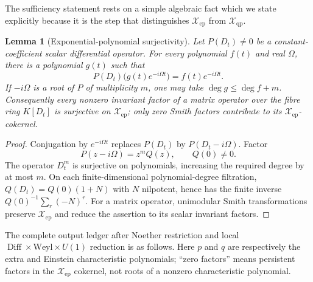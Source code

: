 \documentclass[11pt]{article}
\newtheorem{lemma}[theorem]{Lemma}
\theoremstyle{definition}
\theoremstyle{remark}
\newcommand{\Xep}{\mathscr X_{\mathrm{ep}}}
\newcommand{\Xqp}{\mathscr X_{\mathrm{qp}}}
\newcommand{\Diff}{\operatorname{Diff}}
\begin{document}
The sufficiency statement rests on a simple algebraic fact which we state
explicitly because it is the step that distinguishes \(\Xep\) from
\(\Xqp\).

\begin{lemma}[Exponential-polynomial surjectivity]
\label{lem:ep-surjectivity}
Let \(P(D_t)\ne0\) be a constant-coefficient scalar differential operator.
For every polynomial \(f(t)\) and real \(\Omega\), there is a polynomial
\(g(t)\) such that
\begin{equation}
 P(D_t)\bigl(g(t)e^{-i\Omega t}\bigr)
 =f(t)e^{-i\Omega t}.
\end{equation}
If \(-i\Omega\) is a root of \(P\) of multiplicity \(m\), one may take
\(\deg g\leq\deg f+m\).  Consequently every nonzero invariant factor of a
matrix operator over the fibre ring \(K[D_t]\) is surjective on \(\Xep\);
only zero Smith factors contribute to its \(\Xep\)-cokernel.
\end{lemma}

\begin{proof}
Conjugation by \(e^{-i\Omega t}\) replaces \(P(D_t)\) by
\(P(D_t-i\Omega)\).  Factor
\[
 P(z-i\Omega)=z^mQ(z),\qquad Q(0)\ne0.
\]
The operator \(D_t^m\) is surjective on polynomials, increasing the required
degree by at most \(m\).  On each finite-dimensional polynomial-degree
filtration, \(Q(D_t)=Q(0)(1+N)\) with \(N\) nilpotent, hence has the finite
inverse \(Q(0)^{-1}\sum_r(-N)^r\).  For a matrix operator, unimodular Smith
transformations preserve \(\Xep\) and reduce the assertion to its scalar
invariant factors.
\end{proof}

The complete output ledger after Noether restriction and local
\(\Diff\times\mathrm{Weyl}\times U(1)\) reduction is as follows.  Here
\(p\) and \(q\) are respectively the extra and Einstein characteristic
polynomials; ``zero factors'' means persistent factors in the \(\Xep\)
cokernel, not roots of a nonzero characteristic polynomial.
\end{document}
